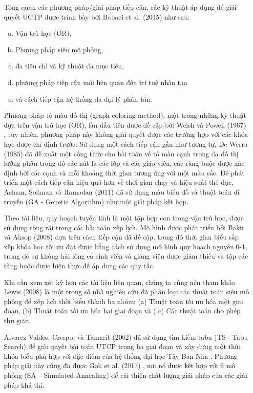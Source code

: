 \documentclass[11pt]{article}
\begin{document}
Tổng quan các phương pháp/giải pháp tiếp cận, các kỹ thuật áp dụng để giải quyết UCTP được trình bày bởi Babaei et al. (2015) \cite{Babaei:al:2015} như sau:

\begin{enumerate}[a.]
\item Vận trù học (OR),
\item Phương pháp siêu mô phỏng,
\item đa tiêu chí và kỹ thuật đa mục tiêu,
\item phương pháp tiếp cận mới liên quan đến trí tuệ nhân tạo
\item và cách tiếp cận hệ thống đa đại lý phân tán.
\end{enumerate}

Phương pháp tô màu đồ thị (graph coloring method), một trong những kỹ thuật dựa trên vận trù học (OR), lần đầu tiên được đề cập bởi Welsh và Powell (1967) \cite{Welsh:Powell:1967}, tuy nhiên, phương pháp này không giải quyết được các trường hợp với các khóa học được chỉ định trước. Sử dụng một cách tiếp cận gần như tương tự, De Werra (1985) \cite{DeWerra:1985} đã đề xuất một công thức cho bài toán về tô màu cạnh trong đa đồ thị lưỡng phân trong đó các nút là các lớp và các giáo viên, các ràng buộc được xác định bởi các cạnh và mỗi khoảng thời gian tương ứng với một màu sắc. Để phát triển một cách tiếp cận hiệu quả hơn về thời gian chạy và hiệu suất thể dục, Asham, Soliman và Ramadan (2011) \cite{Asham:al:2011} đã sử dụng màu biểu đồ và thuật toán di truyền (GA - Genetic Algorithm) như một giải pháp kết hợp.

Theo tài liệu, quy hoạch tuyến tính là một tập hợp con trong vận trù học, được sử dụng rộng rãi trong các bài toán xếp lịch. Mô hình được phát triển bởi Bakir và Aksop (2008) \cite{Bakir:Aksop:2008} dựa trên cách tiếp cận đã đề cập, trong đó thời gian biểu sắp xếp khóa học tối ưu đạt được bằng cách sử dụng mô hình quy hoạch nguyên 0-1, trong đó sự không hài lòng cả sinh viên và giảng viên được giảm thiểu và tập các ràng buộc được hiện thực để áp dụng các quy tắc.

Khi cần xem xét kỹ hơn các tài liệu liên quan, chúng ta cũng nên tham khảo Lewis (2008) \cite{Lewis:2008} là một trong số nhà nghiên cứu đã phân loại các thuật toán siêu mô phỏng để xếp lịch thời biểu thành ba nhóm: (a) Thuật toán tối ưu hóa một giai đoạn, (b) Thuật toán tối ưu hóa hai giai đoạn và ( c) Các thuật toán cho phép thư giãn.

Alvarez-Valdes, Crespo, và Tamarit (2002) \cite{Alvarez-Valdes:al:2002} đã sử dụng tìm kiếm tabu (TS - Tabu Search) để giải quyết bài toán UTCP trong ba giai đoạn và xây dựng một thời khóa biểu phù hợp với đặc điểm của hệ thống đại học Tây Ban Nha . Phương pháp giải này cũng đã được Goh et al. (2017) \cite{Goh:al:2017}, nơi nó được kết hợp với ủ mô phỏng (SA – Simulated Annealing) để cải thiện chất lượng giải pháp của các giải pháp khả thi. 
\end{document}

